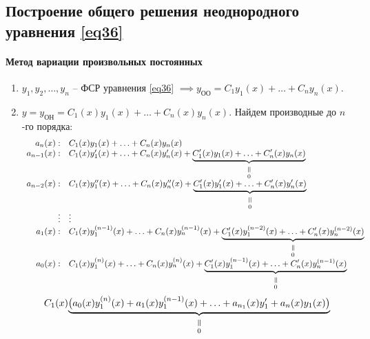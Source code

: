 \documentclass[11pt,a4paper,oneside]{report}
\newcommand{\verteq}[0]{\rotatebox{90}{$=$}}
\newcommand{\equalto}[2]{\underset{\scriptstyle\overset{\mkern4mu\verteq}{#2}}{#1}}
\theoremstyle{definition}
\theoremstyle{plain}
\theoremstyle{remark}
\begin{document}
\subsection*{Построение общего решения неоднородного уравнения \ref{eq36}}

\paragraph*{Метод вариации произвольных постоянных}

\begin{enumerate}
    \item $y_1,y_2,\ldots,y_n$ -- ФСР уравнения \ref{eq36} $\implies y_{\text{ОО}} = C_1y_1(x) + \ldots + C_ny_n(x)$.
    \item $y = y_{\text{ОН}} = C_1(x)y_1(x) + \ldots + C_n(x)y_n(x)$. Найдем производные до $n$-го порядка:
          \begin{equation*}
              \begin{array}{rl}
                  a_{n}(x):   & C_1(x)y_1(x) + \ldots + C_n(x)y_n(x)                                                                                                    \\
                  a_{n-1}(x): & C_1(x)y'_1(x) + \ldots + C_n(x)y'_n(x) + \equalto{\underbrace{C_1'(x)y_1(x) + \ldots + C_n'(x)y_n(x)}}{0}                               \\
                  a_{n-2}(x): & C_1(x)y''_1(x) + \ldots + C_n(x)y''_n(x) + \equalto{\underbrace{C_1'(x)y_1'(x) + \ldots + C_n'(x)y_n'(x)}}{0}                           \\
                  \vdots      & \vdots                                                                                                                                  \\
                  a_1(x):     & C_1(x)y^{(n-1)}_1(x) + \ldots + C_n(x)y^{(n-1)}_n(x) + \equalto{\underbrace{C_1'(x)y_1^{(n-2)}(x) + \ldots + C_n'(x)y_n^{(n-2)}(x)}}{0} \\
                  a_0(x):     & C_1(x)y^{(n)}_1(x) + \ldots + C_n(x)y^{(n)}_n(x) + \equalto{\underbrace{C_1'(x)y_1^{(n-1)}(x) + \ldots + C_n'(x)y_n^{(n-1)}(x)}}{0}     \\
              \end{array}
          \end{equation*}
          \begin{equation*}
              C_1(x)\equalto{\underbrace{\big(a_0(x)y_1^{(n)}(x) + a_1(x)y_1^{(n-1)}(x) + \ldots + a_{n_1}(x)y_1' + a_n(x)y_1(x)\big)}}{0}
          \end{equation*}


\end{enumerate}
\end{document}
